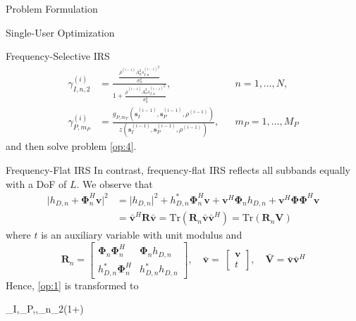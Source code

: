 \documentclass{IEEEtran}
\begin{document}
\begin{section}{Problem Formulation}
\begin{subsection}{Single-User Optimization}
\begin{subsubsection}{Frequency-Selective IRS}
\begin{align}
				\gamma_{I,n,2}^{(i)} & =\frac{\frac{\bar{\rho}^{(i-1)}{A_n^2}{s_{I,n}^{(i-1)}}^2}{\sigma_n^2}}{1+\frac{\bar{\rho}^{(i-1)}{A_n^2}{s_{I,n}^{(i-1)}}^2}{\sigma_n^2}},           &  & n=1,\dots,N,    \\
				\gamma_{P,m_P}^{(i)} & =\frac{g_{P,m_P}(\boldsymbol{s}_I^{(i-1)},\boldsymbol{s}_P^{(i-1)},\rho^{(i-1)})}{z(\boldsymbol{s}_I^{(i-1)},\boldsymbol{s}_P^{(i-1)},\rho^{(i-1)})}, &  & m_P=1,\dots,M_P
			\end{align}
			and then solve problem \ref{op:4}.
		\end{subsubsection}

		\begin{subsubsection}{Frequency-Flat IRS}
			In contrast, frequency-flat IRS reflects all subbands equally with a DoF of $L$. We observe that
			\begin{equation}
				\begin{split}
					\lvert{h_{D,n}+\boldsymbol{\Phi}_n^H\boldsymbol{v}}\rvert^2
					&=\lvert{h_{D,n}}\rvert^2+h_{D,n}^*\boldsymbol{\Phi}_n^H\boldsymbol{v}+\boldsymbol{v}^H\boldsymbol{\Phi}_n{h_{D,n}}+\boldsymbol{v}^H\boldsymbol{\Phi}\boldsymbol{\Phi}^H\boldsymbol{v}\\
					&=\bar{\boldsymbol{v}}^H\boldsymbol{R}\bar{\boldsymbol{v}}=\mathrm{Tr}(\boldsymbol{R}_n\bar{\boldsymbol{v}}\bar{\boldsymbol{v}}^H)=\mathrm{Tr}(\boldsymbol{R}_n\boldsymbol{V})
				\end{split}
			\end{equation}
			where $t$ is an auxiliary variable with unit modulus and
			\begin{equation}
				\boldsymbol{R}_n=
				\begin{bmatrix}
					\boldsymbol{\Phi}_n\boldsymbol{\Phi}_n^H & \boldsymbol{\Phi}_n{h_{D,n}} \\
					h_{D,n}^*{\boldsymbol{\Phi}_n^H}         & h_{D,n}^*{h_{D,n}}
				\end{bmatrix},
				\quad \bar{\boldsymbol{v}}=\
				\begin{bmatrix}
					\boldsymbol{v} \\
					t
				\end{bmatrix},
				\quad \bar{\boldsymbol{V}}=\bar{\boldsymbol{v}}\bar{\boldsymbol{v}}^H
			\end{equation}
			Hence, \ref{op:1} is transformed to
			\begin{maxi}
				{_I,_P,,\rho}{\sum_{n}{\log_2\left(1+\right)}}{\label{op:temp3}}{}

\end{maxi}
\end{subsubsection}
\end{subsection}
\end{section}
\end{document}
